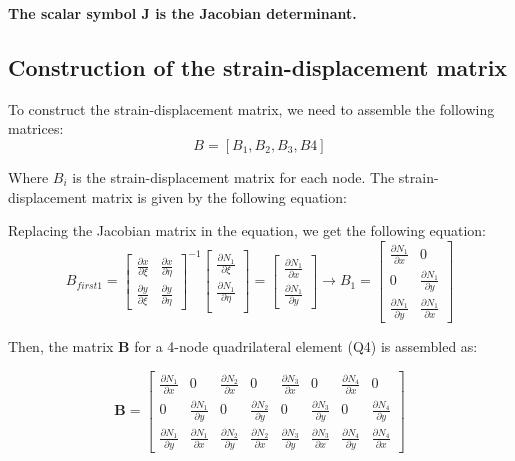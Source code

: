 \documentclass{article}  %
\begin{document}
\textbf{The scalar symbol J is the Jacobian determinant.}

\subsection{Construction of the strain-displacement matrix}

To construct the strain-displacement matrix, we need to assemble the following matrices:
\begin{equation}
  B = [B_1, B_2, B_3, B4]
\end{equation}

Where \( B_i \) is the strain-displacement matrix for each node. The strain-displacement matrix is given by the following equation:


Replacing the Jacobian matrix in the equation, we get the following equation:
\begin{equation}
  B_{first1} =  \begin{bmatrix}
    \frac{\partial x}{\partial \xi} & \frac{\partial x}{\partial \eta} \\
    \frac{\partial y}{\partial \xi} & \frac{\partial y}{\partial \eta}
    \end{bmatrix}^{-1} 
  \begin{bmatrix}
    \frac{\partial N_1}{\partial \xi} \\
    \frac{\partial N_1}{\partial \eta} \\
  \end{bmatrix}
  =
  \begin{bmatrix}
    \frac{\partial N_1}{\partial x} \\
    \frac{\partial N_1}{\partial y} 
  \end{bmatrix}
  \rightarrow
  B_1= \begin{bmatrix}
    \frac{\partial N_1}{\partial x} & 0 \\
    0 & \frac{\partial N_1}{\partial y} \\
    \frac{\partial N_1}{\partial y} & \frac{\partial N_1}{\partial x}
  \end{bmatrix}
\end{equation}

Then, the matrix \( \boldsymbol{B} \) for a 4-node quadrilateral element (Q4) is assembled as:

\[
\boldsymbol{B} =
\begin{bmatrix}
\frac{\partial N_1}{\partial x} & 0 & \frac{\partial N_2}{\partial x} & 0 & \frac{\partial N_3}{\partial x} & 0 & \frac{\partial N_4}{\partial x} & 0 \\
0 & \frac{\partial N_1}{\partial y} & 0 & \frac{\partial N_2}{\partial y} & 0 & \frac{\partial N_3}{\partial y} & 0 & \frac{\partial N_4}{\partial y} \\
\frac{\partial N_1}{\partial y} & \frac{\partial N_1}{\partial x} & \frac{\partial N_2}{\partial y} & \frac{\partial N_2}{\partial x} & \frac{\partial N_3}{\partial y} & \frac{\partial N_3}{\partial x} & \frac{\partial N_4}{\partial y} & \frac{\partial N_4}{\partial x}
\end{bmatrix}
\]
\end{document}
